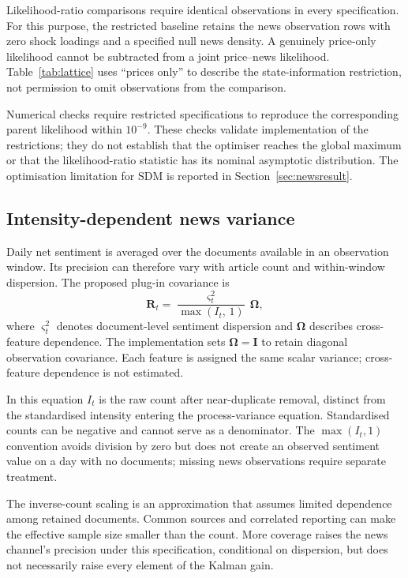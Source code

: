 \documentclass[journal]{IEEEtran}
\begin{document}
Likelihood-ratio comparisons require identical observations in every specification. For this purpose, the restricted baseline retains the news observation rows with zero shock loadings and a specified null news density. A genuinely price-only likelihood cannot be subtracted from a joint price--news likelihood. Table~\ref{tab:lattice} uses ``prices only'' to describe the state-information restriction, not permission to omit observations from the comparison.

Numerical checks require restricted specifications to reproduce the corresponding parent likelihood within $10^{-9}$. These checks validate implementation of the restrictions; they do not establish that the optimiser reaches the global maximum or that the likelihood-ratio statistic has its nominal asymptotic distribution. The optimisation limitation for $\mathrm{SDM}$ is reported in Section~\ref{sec:newsresult}.

\subsection{Intensity-dependent news variance}
\label{sec:Rt}

Daily net sentiment is averaged over the documents available in an observation window. Its precision can therefore vary with article count and within-window dispersion. The proposed plug-in covariance is
\begin{equation}
  \bm{R}_t = \frac{\varsigma_t^{2}}{\max(I_t,\,1)}\,\bm{\Omega} ,
  \label{eq:Rt}
\end{equation}
where $\varsigma_t^2$ denotes document-level sentiment dispersion and $\bm{\Omega}$ describes cross-feature dependence. The implementation sets $\bm{\Omega}=\bm{I}$ to retain diagonal observation covariance. Each feature is assigned the same scalar variance; cross-feature dependence is not estimated.

In this equation $I_t$ is the raw count after near-duplicate removal, distinct from the standardised intensity entering the process-variance equation. Standardised counts can be negative and cannot serve as a denominator. The $\max(I_t,1)$ convention avoids division by zero but does not create an observed sentiment value on a day with no documents; missing news observations require separate treatment.

The inverse-count scaling is an approximation that assumes limited dependence among retained documents. Common sources and correlated reporting can make the effective sample size smaller than the count. More coverage raises the news channel's precision under this specification, conditional on dispersion, but does not necessarily raise every element of the Kalman gain.
\end{document}
